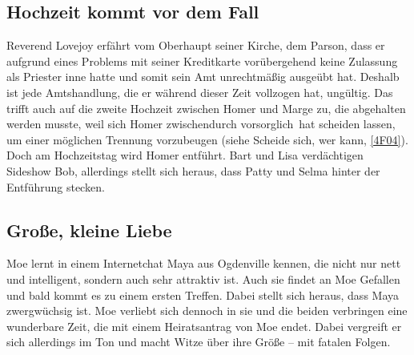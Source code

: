 \subsection{Hochzeit kommt vor dem Fall}\label{LABF05}
Reverend Lovejoy erfährt vom Oberhaupt seiner Kirche, dem Parson, dass er aufgrund eines Problems mit seiner Kreditkarte vorübergehend keine Zulassung als Priester inne hatte und somit sein Amt unrechtmäßig ausgeübt hat. Deshalb ist jede Amtshandlung, die er während dieser Zeit vollzogen hat, ungültig. Das trifft auch auf die zweite Hochzeit zwischen Homer und Marge zu, die abgehalten werden musste, weil sich Homer zwischendurch \glqq vorsorglich\grqq\ hat scheiden lassen, um einer möglichen Trennung vorzubeugen (siehe \glqq Scheide sich, wer kann\grqq , \ref{4F04}). Doch am Hochzeitstag wird Homer entführt. Bart und Lisa verdächtigen Sideshow Bob, allerdings stellt sich heraus, dass Patty und Selma hinter der Entführung stecken.


\subsection{Große, kleine Liebe}\label{LABF06}
Moe lernt in einem Internetchat Maya aus Ogdenville kennen, die nicht nur nett und intelligent, sondern auch sehr attraktiv ist. Auch sie findet an Moe Gefallen und bald kommt es zu einem ersten Treffen. Dabei stellt sich heraus, dass Maya zwergwüchsig ist. Moe verliebt sich dennoch in sie und die beiden verbringen eine wunderbare Zeit, die mit einem Heiratsantrag von Moe endet. Dabei vergreift er sich allerdings im Ton und macht Witze über ihre Größe -- mit fatalen Folgen. 


